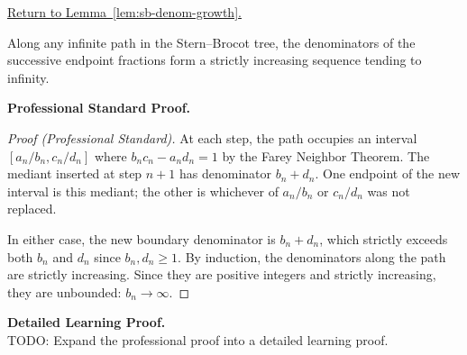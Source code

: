 
\newpage
{}
\label{prf:sb-denom-growth}

\begin{remark*}[Return]
\hyperref[lem:sb-denom-growth]{Return to Lemma~\ref*{lem:sb-denom-growth}.}
\end{remark*}

\begin{theorem*}
Along any infinite path in the Stern--Brocot tree, the denominators of
the successive endpoint fractions form a strictly increasing sequence
tending to infinity.
\end{theorem*}

\textbf{Professional Standard Proof.}~\\
\begin{proof}
[Proof (Professional Standard)]
At each step, the path occupies an interval $[a_n/b_n, c_n/d_n]$ where
$b_n c_n - a_n d_n = 1$ by the Farey Neighbor Theorem.  The mediant
inserted at step $n+1$ has denominator $b_n + d_n$.  One endpoint of the
new interval is this mediant; the other is whichever of $a_n/b_n$ or
$c_n/d_n$ was not replaced.

In either case, the new boundary denominator is $b_n + d_n$, which
strictly exceeds both $b_n$ and $d_n$ since $b_n, d_n \geq 1$.  By
induction, the denominators along the path are strictly increasing.
Since they are positive integers and strictly increasing, they are
unbounded: $b_n \to \infty$.
\end{proof}

\textbf{Detailed Learning Proof.}~\\
TODO: Expand the professional proof into a detailed learning proof.


